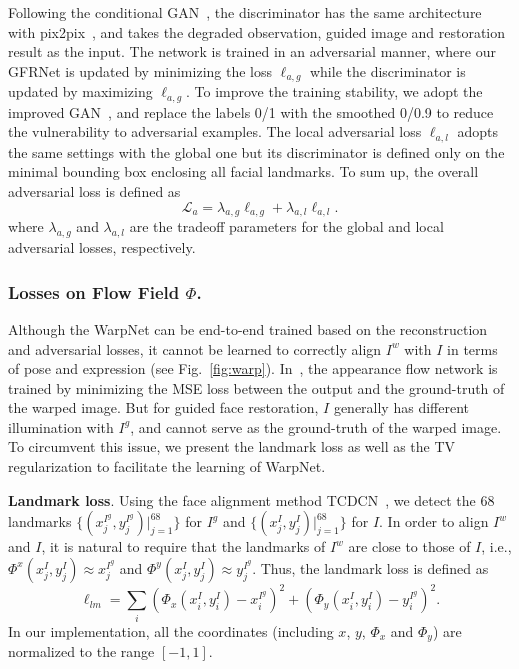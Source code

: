 \documentclass[runningheads]{llncs}
\begin{document}
Following the conditional GAN~\cite{pix2pix2016}, the discriminator has the same architecture with pix2pix~\cite{pix2pix2016}, and takes the degraded observation, guided image and restoration result as the input.
The network is trained in an adversarial manner, where our GFRNet is updated by minimizing the loss $\ell_{a,g}$ while the discriminator is updated by maximizing $\ell_{a,g}$.
To improve the training stability, we adopt the improved GAN~\cite{SalimansGZCRC16}, and replace the labels 0/1 with the smoothed 0/0.9 to reduce the vulnerability to adversarial examples.
The local adversarial loss $\ell_{a,l}$ adopts the same settings with the global one but its discriminator is defined only on the minimal bounding box enclosing all facial landmarks.
To sum up, the overall adversarial loss is defined as
\begin{equation}\label{eqn:adversarial}
\mathcal{L}_a = \lambda_{a,g} \ell_{a,g} + \lambda_{a,l} \ell_{a,l}.
\end{equation}
where $\lambda_{a,g}$ and $\lambda_{a,l}$ are the tradeoff parameters for the global and local adversarial losses, respectively.
\subsubsection{Losses on Flow Field $\Phi$.}
Although the WarpNet can be end-to-end trained based on the reconstruction and adversarial losses,
it cannot be learned to correctly align $I^w$ with $I$ in terms of pose and expression (see Fig.~\ref{fig:warp}).
In~\cite{ganin2016deepwarp,yeh2016semantic}, the appearance flow network is trained by minimizing the MSE loss between the output and the ground-truth of the warped image.
But for guided face restoration, $I$ generally has different illumination with $I^g$, and cannot serve as the ground-truth of the warped image.
To circumvent this issue, we present the landmark loss as well as the TV regularization to facilitate the learning of WarpNet.

\textbf{Landmark loss}.
Using the face alignment method TCDCN~\cite{TCDCN}, we detect the 68 landmarks $\{( {{x_j^{I^g}},{y_j^{I^g}}})|_{j=1}^{68}\}$ for $I^g$ and $\{( {{x_j^{I}},{y_j^{I}}})|_{j=1}^{68}\}$ for $I$.
In order to align $I^w$ and $I$, it is natural to require that the landmarks of $I^w$ are close to those of $I$, i.e., $\Phi^x({{x_j^{I}},{y_j^{I}}}) \approx {x_j^{I^g}}$ and $\Phi^y({{x_j^{I}},{y_j^{I}}}) \approx {y_j^{I^g}}$.
Thus, the landmark loss is defined as
\begin{equation}\label{Eqn1}
\ell_{lm} \!=\! \sum_{i} (\Phi_x({x_i^{I}},{y_i^{I}}) - x_i^{I^g} )^2 + (\Phi_y({x_i^{I}},{y_i^{I}}) - y_i^{I^g} )^2.
\end{equation}
In our implementation, all the coordinates (including $x$, $y$, $\Phi_x$ and $\Phi_y$) are normalized to the range $[-1,1]$.
\end{document}
